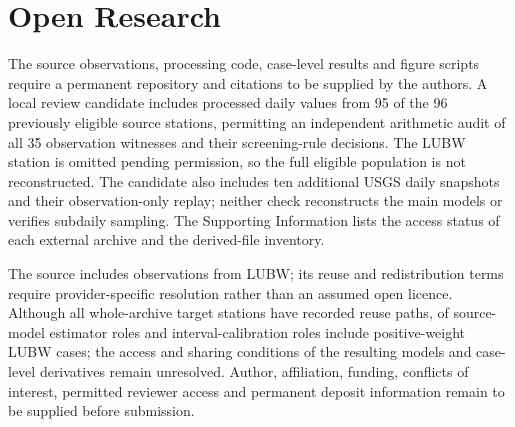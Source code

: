 \documentclass[draft,linenumbers]{agujournal2025}
\begin{document}
\section*{Open Research}
The source observations, processing code, case-level results and figure scripts require a permanent repository and citations to be supplied by the authors. A local review candidate includes processed daily values from 95 of the 96 previously eligible source stations, permitting an independent arithmetic audit of all 35 observation witnesses and their screening-rule decisions. The LUBW station is omitted pending permission, so the full eligible population is not reconstructed. The candidate also includes ten additional USGS daily snapshots and their observation-only replay; neither check reconstructs the main models or verifies subdaily sampling. The Supporting Information lists the access status of each external archive and the derived-file inventory.

The source includes observations from LUBW; its reuse and redistribution terms require provider-specific resolution rather than an assumed open licence. Although all whole-archive target stations have recorded reuse paths, \RightsEstimatorLUBW{} of \RightsModelCombinations{} source-model estimator roles and \RightsCalibrationLUBW{} interval-calibration roles include positive-weight LUBW cases; the access and sharing conditions of the resulting models and case-level derivatives remain unresolved. Author, affiliation, funding, conflicts of interest, permitted reviewer access and permanent deposit information remain to be supplied before submission.



\end{document}
